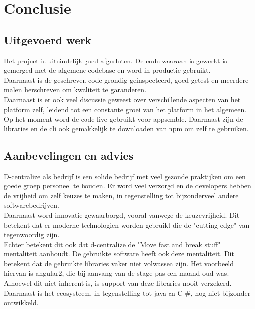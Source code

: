 \chapter{Conclusie}

\section{Uitgevoerd werk}
Het project is uiteindelijk goed afgesloten. De code waaraan is gewerkt  is gemerged met de algemene codebase en word in productie gebruikt. \\

Daarnaast is de geschreven code grondig geinspecteerd, goed getest en meerdere malen herschreven om kwaliteit te garanderen. \\

Daarnaast is er ook veel discussie geweest over verschillende aspecten van het platform zelf, leidend tot een constante groei van het platform in het algemeen. \\

Op het moment word de code live gebruikt voor appsemble. Daarnaast zijn de libraries en de cli ook gemakkelijk te downloaden van npm om zelf te gebruiken. 

\section{Aanbevelingen en advies}

D-centralize als bedrijf is een solide bedrijf met veel gezonde praktijken om een goede groep personeel te houden. Er word veel verzorgd en de developers hebben de vrijheid om zelf keuzes te maken, in tegenstelling tot bijzonderveel andere softwarebedrijven. \\

Daarnaast word innovatie gewaarborgd, vooral vanwege de keuzevrijheid. Dit betekent dat er moderne technologien worden gebruikt die de "cutting edge" van tegenwoordig zijn. \\

Echter betekent dit ook dat d-centralize de "Move fast and break stuff" mentaliteit aanhoudt. De gebruikte software heeft ook deze mentaliteit. Dit betekent dat de gebruikte libraries vaker niet volwassen zijn. Het voorbeeld hiervan is angular2, die bij aanvang van de stage pas een maand oud was. \\

Alhoewel dit niet inherent is, is support van deze libraries nooit verzekerd. Daarnaast is het ecosysteem, in tegenstelling tot java en C	\#, nog niet bijzonder ontwikkeld. \\

